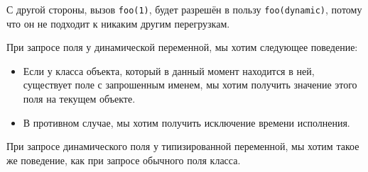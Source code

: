 С другой стороны, вызов \texttt{foo(1)}, будет разрешён в пользу \texttt{foo(dynamic)}, потому что он не подходит к никаким другим перегрузкам.

При запросе поля у динамической переменной, мы хотим следующее поведение:

\begin{itemize}
    \item Если у класса объекта, который в данный момент находится в ней, существует поле с запрошенным именем, мы хотим получить значение этого поля на текущем объекте.
    \item В противном случае, мы хотим получить исключение времени исполнения.
\end{itemize}

При запросе динамического поля у типизированной переменной, мы хотим такое же поведение, как при запросе обычного поля класса.